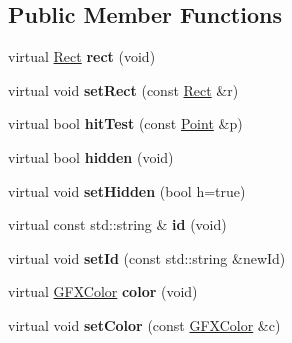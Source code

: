 \subsection*{Public Member Functions}
\begin{DoxyCompactItemize}
\item 
virtual \hyperlink{classRect}{Rect} {\bfseries rect} (void)\hypertarget{classControl_a569c1fdc6ea2f4514cf6fcec2ce40875}{}\label{classControl_a569c1fdc6ea2f4514cf6fcec2ce40875}

\item 
virtual void {\bfseries set\+Rect} (const \hyperlink{classRect}{Rect} \&r)\hypertarget{classControl_a2dadab62e6a1bcf15c3ec16db3df9346}{}\label{classControl_a2dadab62e6a1bcf15c3ec16db3df9346}

\item 
virtual bool {\bfseries hit\+Test} (const \hyperlink{classPoint}{Point} \&p)\hypertarget{classControl_acca4a39f312b22762ffe1b63186460c2}{}\label{classControl_acca4a39f312b22762ffe1b63186460c2}

\item 
virtual bool {\bfseries hidden} (void)\hypertarget{classControl_a002c9a2dfcccd6bf7a7f5b428fa88ca4}{}\label{classControl_a002c9a2dfcccd6bf7a7f5b428fa88ca4}

\item 
virtual void {\bfseries set\+Hidden} (bool h=true)\hypertarget{classControl_a0606de6ff054f80fed7f29e451a7663a}{}\label{classControl_a0606de6ff054f80fed7f29e451a7663a}

\item 
virtual const std\+::string \& {\bfseries id} (void)\hypertarget{classControl_a8721efbbb7b42f0dd36c79a76540993b}{}\label{classControl_a8721efbbb7b42f0dd36c79a76540993b}

\item 
virtual void {\bfseries set\+Id} (const std\+::string \&new\+Id)\hypertarget{classControl_a28cf75180031844cb573b2f2729438b5}{}\label{classControl_a28cf75180031844cb573b2f2729438b5}

\item 
virtual \hyperlink{structGFXColor}{G\+F\+X\+Color} {\bfseries color} (void)\hypertarget{classControl_a14d9529c5c0d6aaf6da28cb61ce39bfb}{}\label{classControl_a14d9529c5c0d6aaf6da28cb61ce39bfb}

\item 
virtual void {\bfseries set\+Color} (const \hyperlink{structGFXColor}{G\+F\+X\+Color} \&c)\hypertarget{classControl_acb91720cc14c817ec3982aa51ca4b6bc}{}\label{classControl_acb91720cc14c817ec3982aa51ca4b6bc}


\end{DoxyCompactItemize}
